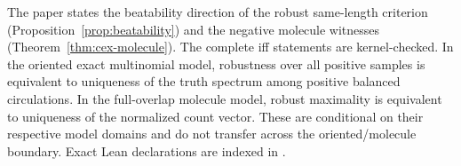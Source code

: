\begin{remark}
\label{rem:robust-iff-criteria}
The paper states the beatability direction of the robust same-length
criterion (Proposition~\ref{prop:beatability}) and the negative molecule
witnesses (Theorem~\ref{thm:cex-molecule}). The complete iff statements are kernel-checked. In the
oriented exact multinomial model, robustness over all
positive samples is equivalent to uniqueness of the truth
spectrum among positive balanced circulations. In the
full-overlap molecule model, robust maximality is equivalent
to uniqueness of the normalized count vector. These are
conditional on their respective model domains and do not
transfer across the oriented/molecule boundary. Exact Lean
declarations are indexed in .
\end{remark}
